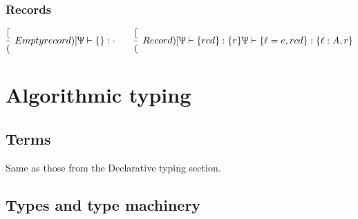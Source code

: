 \documentclass{article}
\newcommand{\rcd}[1]{\{#1\}}
\newcommand{\emptyrow}{\cdot}
\newcommand{\spc}{\qquad}
\newcommand{\declCtx}{\Uppsi}
\newcommand{\derives}[3]{#1 \vdash #2 : #3}
\newcommand{\lbl}{\ell}
\newcommand{\row}{r}
\newcommand{\tp}{A}
\newcommand{\deduct}[3][]
{
  \begin{prooftree}
    \hypo{#2}
    \infer1[\text{#1}]{#3}
  \end{prooftree}
}
\begin{document}
\subsubsection{Records}
\[
  \deduct
  [(Empty record)]
  {}
  {\derives \declCtx {\rcd{}} \emptyrow}
  \spc
  \deduct
  [(Record)]
  {\derives \declCtx {\rcd {rcd}} {\rcd \row}}
  {\derives \declCtx {\rcd{\lbl=e,rcd}} {\rcd{\lbl : \tp, \row}}}
\]

\section{Algorithmic typing}

\subsection{Terms}

Same as those from the Declarative typing section.

\subsection{Types and type machinery}
\end{document}
